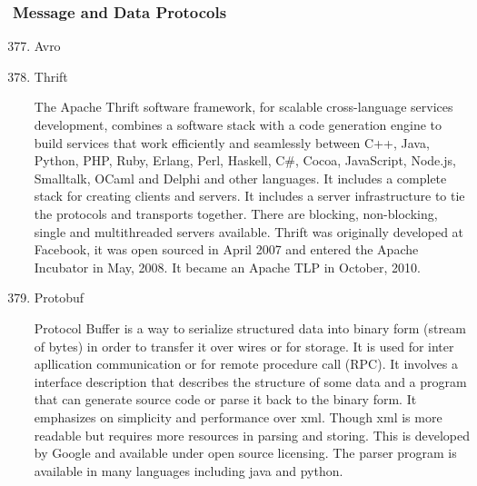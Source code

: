 \subsubsection{Message and Data Protocols}
\label{\detokenize{i524/technologies:message-and-data-protocols}}\begin{enumerate}
\setcounter{enumi}{376}
\item {} 
Avro

\item {} 
Thrift

The Apache Thrift software framework, for scalable cross-language
services development, combines a software stack with a code generation
engine to build services that work efficiently and seamlessly between
C++, Java, Python, PHP, Ruby, Erlang, Perl, Haskell, C\#, Cocoa,
JavaScript, Node.js, Smalltalk, OCaml and Delphi and other
languages. \label{\detokenize{i524/technologies:id689}}{\hyperref[\detokenize{i524/technologies:paper-thrift}]{\sphinxcrossref{{[}600{]}}}} It includes a complete stack for
creating clients and servers. It includes a server infrastructure to
tie the protocols and transports together. There are blocking,
non-blocking, single and multithreaded servers available.  Thrift was
originally developed at Facebook, it was open sourced in April 2007
and entered the Apache Incubator in May, 2008. It became an Apache TLP
in October, 2010. \label{\detokenize{i524/technologies:id690}}{\hyperref[\detokenize{i524/technologies:www-thrift}]{\sphinxcrossref{{[}601{]}}}}

\item {} 
Protobuf

Protocol Buffer \label{\detokenize{i524/technologies:id691}}{\hyperref[\detokenize{i524/technologies:www-protobuf}]{\sphinxcrossref{{[}602{]}}}} is a way to serialize
structured data into binary form (stream of bytes) in order to
transfer it over wires or for storage. It is used for inter
apllication communication or for remote procedure call (RPC). It
involves a interface description that describes the structure of
some data and a program that can generate source code or parse it
back to the binary form. It emphasizes on simplicity and
performance over xml. Though xml is more readable but requires
more resources in parsing and storing.  This is developed by
Google and available under open source licensing. The parser
program is available in many languages including java and python.

\end{enumerate}



